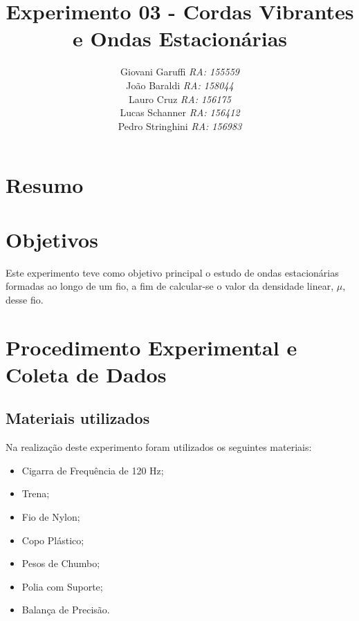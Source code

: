 \documentclass[12pt,a4paper]{article}
\begin{document}
\title{\vspace{70mm}\Huge Experimento 03 - Cordas Vibrantes e Ondas Estacionárias}
\author{ Giovani Garuffi\qquad\hfill
		\textit {RA: 155559}\protect\\
		João Baraldi\hfill
		\textit{RA: 158044}\protect\\
		Lauro Cruz\hfill
		\textit{RA: 156175}\protect\\
		Lucas Schanner\hfill
		\textit{RA: 156412}\protect\\
		Pedro Stringhini\hfill
		\textit {RA: 156983}								
		}
\maketitle
\newpage
\section{Resumo}

\section{Objetivos}
Este experimento teve como objetivo principal o estudo de ondas estacionárias formadas ao longo de um fio, a fim de calcular-se o valor da densidade linear, $\mu$, desse fio.

\section{Procedimento Experimental e Coleta de Dados}

\subsection{Materiais utilizados}
Na realização deste experimento foram utilizados os seguintes materiais:
\begin{itemize}
	\item Cigarra de Frequência de 120 Hz;
	\item Trena;
	\item Fio de Nylon;
	\item Copo Plástico;
	\item Pesos de Chumbo;
	\item Polia com Suporte;
	\item Balança de Precisão.
\end{itemize}
\end{document}
